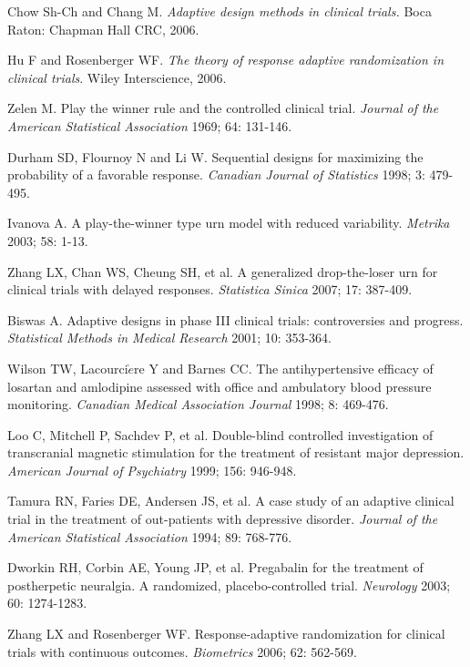 \begin{thebibliography}
 Chow Sh-Ch and Chang M. \textit{Adaptive design methods in clinical trials.} Boca Raton: Chapman Hall CRC, 2006.

 Hu F and  Rosenberger WF. \textit{The theory of response adaptive randomization in clinical trials}. Wiley Interscience, 2006.

 Zelen M. Play the winner rule and the controlled clinical trial. \textit{Journal of the American Statistical Association}  1969; 64: 131-146.

 Durham SD, Flournoy N and Li W. Sequential designs for maximizing the probability of a favorable response. \textit{Canadian Journal of Statistics} 1998; 3: 479-495.

 Ivanova A. A play-the-winner type urn model with reduced variability. \textit{Metrika} 2003; 58: 1-13.

 Zhang LX, Chan WS, Cheung SH, et al. A generalized drop-the-loser urn for clinical trials with delayed responses. \textit{Statistica Sinica} 2007; 17: 387-409.

 Biswas A. Adaptive designs in phase III clinical trials: controversies and progress. \textit{Statistical Methods in Medical Research} 2001; 10: 353-364.

 Wilson TW,  Lacourci$\grave{e}$re Y and  Barnes CC. The antihypertensive efficacy of losartan and amlodipine assessed with office and ambulatory blood pressure monitoring. \textit{Canadian Medical Association Journal} 1998; 8: 469-476.

 Loo C, Mitchell P, Sachdev P, et al. Double-blind controlled investigation of transcranial magnetic stimulation for the treatment of resistant major depression. \textit{American Journal of Psychiatry} 1999; 156: 946-948.

 Tamura RN, Faries DE, Andersen JS, et al. A case study of an adaptive clinical trial in the treatment of out-patients with depressive disorder. \textit{Journal of the American Statistical Association} 1994; 89: 768-776.

 Dworkin RH, Corbin AE, Young JP, et al. Pregabalin for the treatment of  postherpetic neuralgia. A randomized, placebo-controlled trial. \textit{Neurology} 2003; 60: 1274-1283.

 Zhang LX and Rosenberger WF.  Response-adaptive randomization for clinical trials with continuous outcomes. \textit{Biometrics} 2006; 62: 562-569.


\end{thebibliography}
